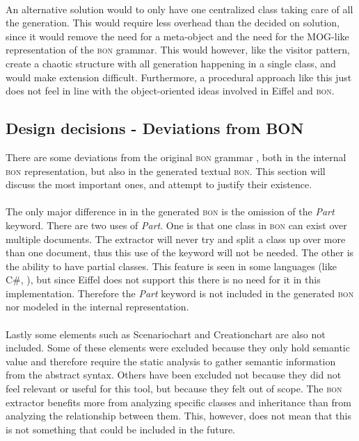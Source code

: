 \paragraph{}
An alternative solution would to only have one centralized class taking care of all the generation. This would require less overhead than the decided on solution, since it would remove the need for a meta-object and the need for the MOG-like representation of the \textsc{bon} grammar. This would however, like the visitor pattern, create a chaotic structure with all generation happening in a single class, and would make extension difficult. Furthermore, a procedural approach like this just does not feel in line with the object-oriented ideas involved in Eiffel and \textsc{bon}.

\subsection{Design decisions - Deviations from BON}
\label{deviations_from_bon}There are some deviations from the original \textsc{bon} grammar \cite[pp.~352-359]{walden1995}, both in the internal \textsc{bon} representation, but also in the generated textual \textsc{bon}. This section will discuss the most important ones, and attempt to justify their existence. 

\paragraph{}
The only major difference in in the generated \textsc{bon} is the omission of the \textit{Part} keyword. There are two uses of \textit{Part}. One is that one class in \textsc{bon} can exist over multiple documents. The extractor will never try and split a class up over more than one document, thus this use of  the keyword will not be needed. The other is the ability to have partial classes. This feature is seen in some languages (like C\#, \cite{msdn2009}), but since Eiffel does not support this there is no need for it in this implementation. Therefore the \textit{Part} keyword is not included in the generated \textsc{bon} nor modeled in the internal representation.

\paragraph{}
Lastly some elements such as Scenario\textunderscore chart and Creation\textunderscore chart are also not included. Some of these elements were excluded because they only hold semantic value and therefore require the static analysis to gather semantic information from the abstract syntax. Others have been excluded not because they did not feel relevant or useful for this tool, but because they felt out of scope. The \textsc{bon} extractor benefits more from analyzing specific classes and inheritance than from analyzing the relationship between them. This, however, does not mean that this is not something that could be included in the future.
